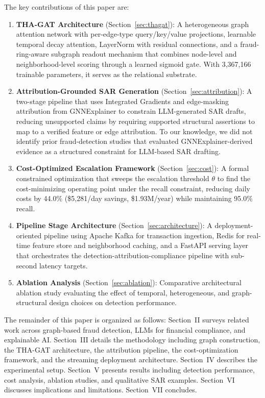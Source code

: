 \documentclass[journal]{IEEEtran}
\begin{document}
The key contributions of this paper are:

\begin{enumerate}
\item \textbf{THA-GAT Architecture} (Section~\ref{sec:thagat}): A heterogeneous graph attention network with per-edge-type query/key/value projections, learnable temporal decay attention, LayerNorm with residual connections, and a fraud-ring-aware subgraph readout mechanism that combines node-level and neighborhood-level scoring through a learned sigmoid gate. With 3,367,166 trainable parameters, it serves as the relational substrate.

\item \textbf{Attribution-Grounded SAR Generation} (Section~\ref{sec:attribution}): A two-stage pipeline that uses Integrated Gradients and edge-masking attribution from GNNExplainer to constrain LLM-generated SAR drafts, reducing unsupported claims by requiring supported structural assertions to map to a verified feature or edge attribution. To our knowledge, we did not identify prior fraud-detection studies that evaluated GNNExplainer-derived evidence as a structured constraint for LLM-based SAR drafting.

\item \textbf{Cost-Optimized Escalation Framework} (Section~\ref{sec:cost}): A formal constrained optimization that sweeps the escalation threshold $\theta$ to find the cost-minimizing operating point under the recall constraint, reducing daily costs by 44.0\% (\$5,281/day savings, \$1.93M/year) while maintaining 95.0\% recall.

\item \textbf{Pipeline Stage Architecture} (Section~\ref{sec:architecture}): A deployment-oriented pipeline using Apache Kafka for transaction ingestion, Redis for real-time feature store and neighborhood caching, and a FastAPI serving layer that orchestrates the detection-attribution-compliance pipeline with sub-second latency targets.

\item \textbf{Ablation Analysis} (Section~\ref{sec:ablation}): Comparative architectural ablation study evaluating the effect of temporal, heterogeneous, and graph-structural design choices on detection performance.
\end{enumerate}

The remainder of this paper is organized as follows: Section~II surveys related work across graph-based fraud detection, LLMs for financial compliance, and explainable AI. Section~III details the methodology including graph construction, the THA-GAT architecture, the attribution pipeline, the cost-optimization framework, and the streaming deployment architecture. Section~IV describes the experimental setup. Section~V presents results including detection performance, cost analysis, ablation studies, and qualitative SAR examples. Section~VI discusses implications and limitations. Section~VII concludes.
\end{document}
